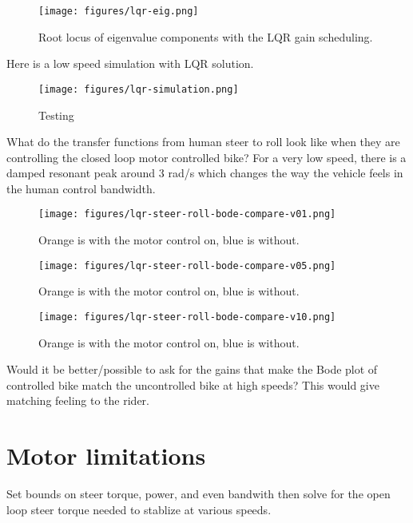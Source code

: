 \documentclass[12pt]{article}
\begin{document}
\begin{figure}
  \centering
  \texttt{[image: figures/lqr-eig.png]}
  \caption{Root locus of eigenvalue components with the LQR gain scheduling.}
  \label{fig:lqr-eig}
\end{figure}

Here is a low speed simulation with LQR solution.

\begin{figure}
  \centering
  \texttt{[image: figures/lqr-simulation.png]}
  \caption{Testing}
  \label{fig:lqr-simulation}
\end{figure}

What do the transfer functions from human steer to roll look like when they are
controlling the closed loop motor controlled bike? For a very low speed, there
is a damped resonant peak around 3 rad/s which changes the way the vehicle
feels in the human control bandwidth.

\begin{figure}
  \centering
  \texttt{[image: figures/lqr-steer-roll-bode-compare-v01.png]}
  \caption{Orange is with the motor control on, blue is without.}
  \label{fig:lqr-steer-roll-bode-compare-v01}
\end{figure}

\begin{figure}
  \centering
  \texttt{[image: figures/lqr-steer-roll-bode-compare-v05.png]}
  \caption{Orange is with the motor control on, blue is without.}
  \label{fig:lqr-steer-roll-bode-compare-v05}
\end{figure}

\begin{figure}
  \centering
  \texttt{[image: figures/lqr-steer-roll-bode-compare-v10.png]}
  \caption{Orange is with the motor control on, blue is without.}
  \label{fig:lqr-steer-roll-bode-compare-v10}
\end{figure}

Would it be better/possible to ask for the gains that make the Bode plot of
controlled bike match the uncontrolled bike at high speeds? This would give
matching feeling to the rider.

\section{Motor limitations}

Set bounds on steer torque, power, and even bandwith then solve for the open
loop steer torque needed to stablize at various speeds.
\end{document}
